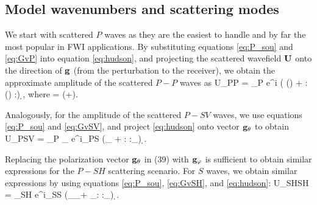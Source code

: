 \subsection{Model wavenumbers and scattering modes}
We start with scattered $P$ waves as they are the easiest to handle and by far the most popular in FWI applications. By substituting equations \eqref{eq:P_sou} and \eqref{eq:GvP} into equation \eqref{eq:hudson}, and projecting the scattered wavefield $\mathbf{U}$ onto the direction of $\mathbf{g}$ (from the perturbation to the receiver), we obtain the approximate amplitude of the scattered $P-P$ waves \citep{kazei2018} as
\beq \label{eq:UPPInt}\label{eq:UPPInt1}
\delta U_{PP} = \delta \Uv_P \cdot \svn  \propto 
\intyV   e^{i\Kv \cdot \xv} (\svn\cdot\gvn \delta \nmz{\rho} (\xv) + \svn\svn : \delta 
\nmz{\cv}(\xv) :\gvn\gvn) \d \xv, 
\eeq
where
\beq \label{eq:K}
\Kv = \omega(\sv+\gv).
\eeq

Analogously, for the amplitude of the scattered $P-SV$ waves, we use equations \eqref{eq:P_sou} and \eqref{eq:GvSV}, and project \eqref{eq:hudson} onto vector $\mathbf{g}_{\theta}$ to obtain
\beq \label{eq:UPSVInt}
\delta U_{PSV} = \delta \Uv_P \cdot \sv_\theta 
\propto   
\intyV  e^{i\Kv_{PS}\cdot\xv} (\svn\cdot\gv_{\theta} \delta \nmz{\rho} +  \svn\svn : \delta \nmz{\cv} :\gvn\gv_{\theta}) \d \xv. 
\eeq

Replacing the polarization vector $\mathbf{g}_\theta$ in (39) with $\mathbf{g}_\varphi$ is sufficient to obtain similar expressions for the $P-SH$ scattering scenario. For $S$ waves, we obtain similar expressions by using equations \eqref{eq:P_sou}, \eqref{eq:GvSH}, and \eqref{eq:hudson}:
\beq \label{eq:USHSHInt}
\delta U_{SHSH} = \delta \Uv_{SH} \cdot {\sv_\phi} 
\propto 
\intyV  e^{i\Kv_{SS}\cdot\xv} (\sv_\phi \cdot \gv_\phi \delta \rho +  \nmz{\sv}\sv_\phi : \delta \nmz{\cv} :\nmz{\gv}\gv_{\phi}) \d \xv. 
\eeq

